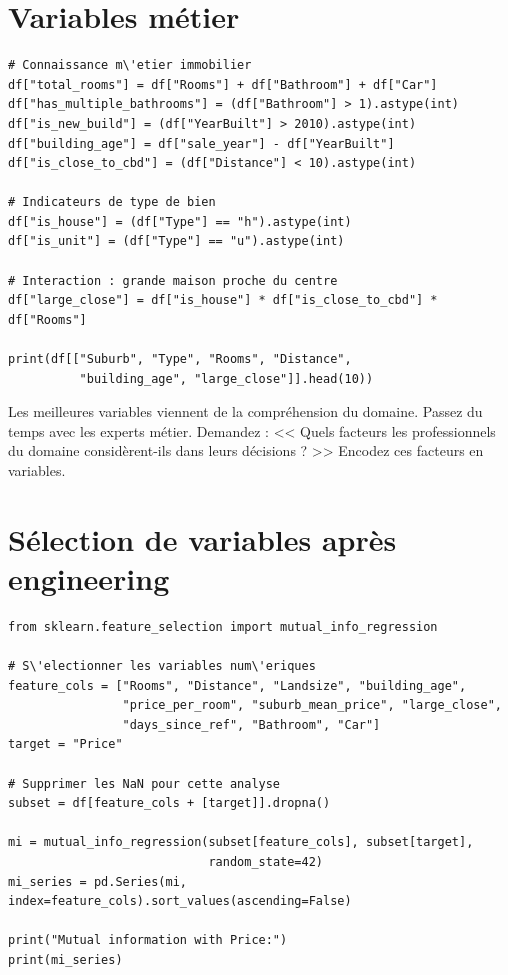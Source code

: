 \section{Variables m\'etier}

\begin{verbatim}
# Connaissance m\'etier immobilier
df["total_rooms"] = df["Rooms"] + df["Bathroom"] + df["Car"]
df["has_multiple_bathrooms"] = (df["Bathroom"] > 1).astype(int)
df["is_new_build"] = (df["YearBuilt"] > 2010).astype(int)
df["building_age"] = df["sale_year"] - df["YearBuilt"]
df["is_close_to_cbd"] = (df["Distance"] < 10).astype(int)

# Indicateurs de type de bien
df["is_house"] = (df["Type"] == "h").astype(int)
df["is_unit"] = (df["Type"] == "u").astype(int)

# Interaction : grande maison proche du centre
df["large_close"] = df["is_house"] * df["is_close_to_cbd"] * df["Rooms"]

print(df[["Suburb", "Type", "Rooms", "Distance",
          "building_age", "large_close"]].head(10))
\end{verbatim}

\begin{datatip}
Les meilleures variables viennent de la compr\'ehension du domaine. Passez du temps avec les experts m\'etier. Demandez : << Quels facteurs les professionnels du domaine consid\`erent-ils dans leurs d\'ecisions ? >> Encodez ces facteurs en variables.
\end{datatip}

\section{S\'election de variables apr\`es engineering}

\begin{verbatim}
from sklearn.feature_selection import mutual_info_regression

# S\'electionner les variables num\'eriques
feature_cols = ["Rooms", "Distance", "Landsize", "building_age",
                "price_per_room", "suburb_mean_price", "large_close",
                "days_since_ref", "Bathroom", "Car"]
target = "Price"

# Supprimer les NaN pour cette analyse
subset = df[feature_cols + [target]].dropna()

mi = mutual_info_regression(subset[feature_cols], subset[target],
                            random_state=42)
mi_series = pd.Series(mi, index=feature_cols).sort_values(ascending=False)

print("Mutual information with Price:")
print(mi_series)
\end{verbatim}

